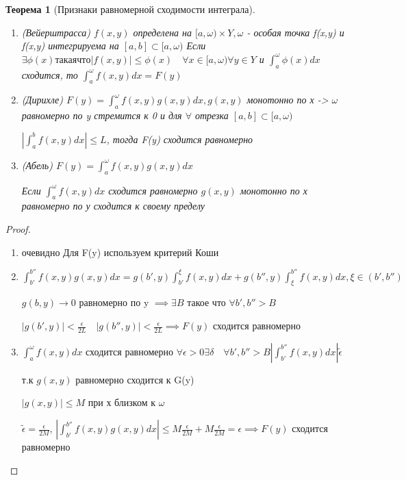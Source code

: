 \documentclass[a4paper]{article}
\newtheorem{theorem}{Теорема}[section]
\theoremstyle{definition}
\theoremstyle{remark}
\begin{document}
\begin{theorem}[Признаки равномерной сходимости интеграла]
     \begin{enumerate}
          \item(Вейерштрасса) $f(x,y)$ определена на $[a, \omega)\times Y, \omega$ - особая точка f(x,y) и f(x,y) интегрируема на $[a,b]\subset[a, \omega)$
          Если $\exists \phi(x) такая что |f(x,y)| \leq\phi(x)\quad \forall x \in [a,\omega)\forall y\in Y$ и $\int_a^\omega \phi(x)dx$ сходится, то $\int_a^\omega f(x, y)dx = F(y)$
          \item(Дирихле) $F(y) = \int_a^\omega f(x, y)g(x,y)dx, g(x,y)$ монотонно по х -> $\omega$ равномерно по y стремится к 0
          и для $\forall$ отрезка $[a,b]\subset[a,\omega)$

          $|\int_a^b f(x, y)dx|\leq L$, тогда F(y) сходится равномерно
          \item (Абель) $F(y) = \int_a^\omega f(x, y)g(x,y)dx$
          
          Если $\int_a^\omega f(x, y)dx$ сходится равномерно $g(x,y)$ монотонно по х равномерно по у сходится к своему пределу 
     \end{enumerate}
\end{theorem}
\begin{proof}
     \begin{enumerate}
          \item очевидно
          Для F(y) используем критерий Коши
          \item $\int_{b'}^{b''}f(x,y)g(x,y)dx = g(b', y)\int_{b'}^\xi f(x,y)dx + g(b'', y)\int_{\xi}^{b''} f(x,y)dx, \xi \in (b', b'')$
          
          $g(b, y)\to 0$ равномерно по y $\implies\exists B$ такое что $\forall b', b'' > B$

          $|g(b', y)|< \frac{\epsilon}{2L}\quad |g(b'', y)|< \frac{\epsilon}{2L}\implies F(y)$ сходится равномерно
          \item $\int_a^\omega f(x,y)dx$ сходится равномерно
          $\forall \epsilon>0 \exists\delta \quad \forall b', b'' > B |\int_{b'}^{b''}f(x,y)dx| \widetilde{\epsilon}$

          т.к $g(x,y)$ равномерно сходится к G(y)

          $|g(x,y)|\leq M$ при х близком к $\omega$

          $\widetilde{\epsilon} = \frac{\epsilon}{2M}$, $|\int_{b'}^{b''}f(x,y)g(x,y)dx|\leq M\frac{\epsilon}{2M} +M\frac{\epsilon}{2M} = \epsilon\implies F(y)$ сходится равномерно
     \end{enumerate}
\end{proof}
\end{document}

